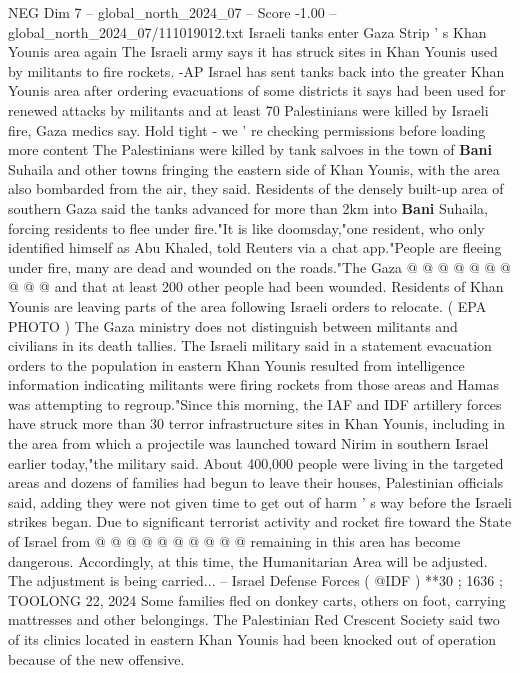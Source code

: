 \begin{textsample}{NEG Dim 7 – global\_north\_2024\_07 – Score -1.00 – global\_north\_2024\_07/111019012.txt}  \label{ex:f7_neg_408}
Israeli tanks enter Gaza Strip ' s Khan Younis area again The Israeli army says it has struck sites in Khan Younis used by militants to fire rockets. -AP Israel has sent tanks back into the greater Khan Younis area after ordering evacuations of some districts it says had been used for renewed attacks by militants and at least 70 Palestinians were killed by Israeli fire, Gaza medics say.
Hold tight - we ' re checking permissions before loading more content The Palestinians were killed by tank salvoes in the town of \textbf{Bani} Suhaila and other towns fringing the eastern side of Khan Younis, with the area also bombarded from the air, they said.
Residents of the densely built-up area of southern Gaza said the tanks advanced for more than 2km into \textbf{Bani} Suhaila, forcing residents to flee under fire."It is like doomsday,"one resident, who only identified himself as Abu Khaled, told Reuters via a chat app."People are fleeing under fire, many are dead and wounded on the roads."The Gaza @ @ @ @ @ @ @ @ @ @ and that at least 200 other people had been wounded.
Residents of Khan Younis are leaving parts of the area following Israeli orders to relocate. ( EPA PHOTO ) The Gaza ministry does not distinguish between militants and civilians in its death tallies.
The Israeli military said in a statement evacuation orders to the population in eastern Khan Younis resulted from intelligence information indicating militants were firing rockets from those areas and Hamas was attempting to regroup."Since this morning, the IAF and IDF artillery forces have struck more than 30 terror infrastructure sites in Khan Younis, including in the area from which a projectile was launched toward Nirim in southern Israel earlier today,"the military said.
About 400,000 people were living in the targeted areas and dozens of families had begun to leave their houses, Palestinian officials said, adding they were not given time to get out of harm ' s way before the Israeli strikes began.
Due to significant terrorist activity and rocket fire toward the State of Israel from @ @ @ @ @ @ @ @ @ @ remaining in this area has become dangerous.
Accordingly, at this time, the Humanitarian Area will be adjusted.
The adjustment is being carried... -- Israel Defense Forces ( @IDF ) **30 ; 1636 ; TOOLONG 22, 2024 Some families fled on donkey carts, others on foot, carrying mattresses and other belongings.
The Palestinian Red Crescent Society said two of its clinics located in eastern Khan Younis had been knocked out of operation because of the new offensive.

\end{textsample}
